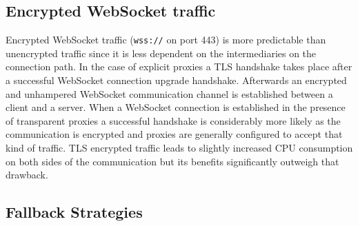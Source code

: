 \newpage
\subsection{Encrypted WebSocket traffic}

Encrypted WebSocket traffic (\texttt{wss://} on port 443) is more predictable than unencrypted traffic since it is less dependent on the intermediaries on the connection path. In the case of explicit proxies a TLS handshake takes place after a successful WebSocket connection upgrade handshake. Afterwards an encrypted and unhampered WebSocket communication channel is established between a client and a server. When a WebSocket connection is established in the presence of transparent proxies a successful handshake is considerably more likely as the communication is encrypted and proxies are generally configured to accept that kind of traffic. TLS encrypted traffic leads to slightly increased CPU consumption on both sides of the communication but its benefits significantly outweigh that drawback.

\subsection{Fallback Strategies}

